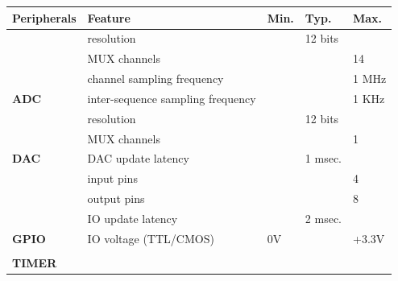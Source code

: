 \documentclass[letterpaper,10pt,english]{hitec}
\begin{document}
\begin{table}[h!]
\begin{tabular}{l|l|lll}
\rowcolor[HTML]{9B9B9B} 
\textbf{Peripherals}                                     & \textbf{Feature}                    & \textbf{Min.} & \textbf{Typ.} & \textbf{Max.} \\ \hline
\cellcolor[HTML]{C0C0C0}                                 & resolution                          &               & 12 bits       &               \\
\cellcolor[HTML]{C0C0C0}                                 & MUX channels                        &               &               & 14            \\
\cellcolor[HTML]{C0C0C0}                                 & channel sampling frequency          &               &               & 1 MHz         \\
\multirow{-4}{*}{\cellcolor[HTML]{C0C0C0}\textbf{ADC}}   & inter-sequence sampling frequency   &               &               & 1 KHz        \\ \hline
\cellcolor[HTML]{C0C0C0}                                 & resolution                          &               & 12 bits       &               \\
\cellcolor[HTML]{C0C0C0}                                 & MUX channels                        &               &               & 1             \\
\multirow{-3}{*}{\cellcolor[HTML]{C0C0C0}\textbf{DAC}}   & DAC update latency                  &               & 1 msec.       &               \\ \hline
\cellcolor[HTML]{C0C0C0}                                 & input pins                          &               &               & 4             \\
\cellcolor[HTML]{C0C0C0}                                 & output pins                         &               &               & 8             \\
\cellcolor[HTML]{C0C0C0}                                 & IO update latency                   &               & 2 msec.       &               \\
\multirow{-4}{*}{\cellcolor[HTML]{C0C0C0}\textbf{GPIO}}  & IO voltage (TTL/CMOS)               & 0V            &               & +3.3V         \\ \hline
\cellcolor[HTML]{C0C0C0}                                 &                                     &               &               &               \\
\multirow{-2}{*}{\cellcolor[HTML]{C0C0C0}\textbf{TIMER}} &                                     &               &               &               \\ \hline

\end{tabular}
\end{table}
\end{document}
